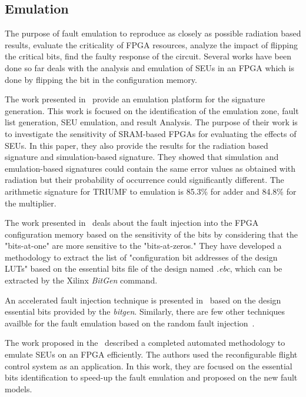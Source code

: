 \subsection{Emulation}

The purpose of fault emulation to reproduce as closely as possible radiation based results, evaluate the criticality of FPGA resources, analyze the impact of flipping the critical bits, find the faulty response of the circuit. Several works have been done so far deals with the analysis and emulation of SEUs in an FPGA which is done by flipping the bit in the configuration memory. 

The work presented in~\cite{hobeika2014multi} provide an emulation platform for the signature generation. This work is focused on the identification of the emulation zone,  fault list generation, SEU emulation, and result Analysis. The purpose of their work is to investigate the sensitivity of SRAM-based FPGAs for evaluating the effects of SEUs. In this paper, they also provide the results for the radiation based signature and simulation-based signature. They showed that simulation and emulation-based signatures could contain the same error values as obtained with radiation but their probability of occurrence could significantly different. The arithmetic signature for TRIUMF to emulation is 85.3\% for adder and 84.8\% for the multiplier. 

The work presented in~\citep{souari2015optimization, souari2016towards} deals about the fault injection into the FPGA configuration memory based on the sensitivity of the bits by considering that the "bits-at-one" are more sensitive to the "bits-at-zeros." They have developed a methodology to extract the list of "configuration bit addresses of the design LUTs" based on the essential bits file of the design named \textit{.ebc},  which can be extracted by the Xilinx \textit{BitGen} command.




An accelerated fault injection technique is presented in~\citep{di2014fault} based on the design essential bits provided by the \textit{bitgen}. Similarly, there are few other techniques availble for the fault emulation based on the random fault injection~\citep{faure2005single}.


The work proposed in the~\cite{hobeika2013flight} described a completed automated methodology to emulate SEUs on an FPGA efficiently. The authors used the reconfigurable flight control system as an application.
In this work, they are focused on the essential bits identification to speed-up the fault emulation and proposed on the new fault models.



